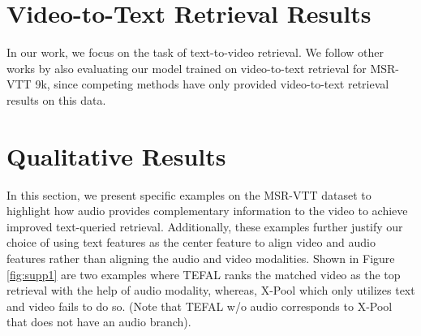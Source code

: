 \documentclass[10pt,twocolumn,letterpaper]{article}
\begin{document}
\clearpage


\ificcvfinal
\thispagestyle{empty}
\fi
\appendix



\setcounter{table}{0}
\setcounter{figure}{0}
\renewcommand{\thetable}{T\arabic{table}}
\renewcommand{\thefigure}{F\arabic{figure}}

\section{Video-to-Text Retrieval Results}

In our work, we focus on the task of text-to-video retrieval. We follow other works by also evaluating our model trained on video-to-text retrieval for MSR-VTT 9k, since competing methods have only provided video-to-text retrieval results on this data. 

\begin{table}[hbt!]
 \centering
 \caption{Video-to-Text Retrieval Results on MSR-VTT 9k split. All works use a CLIP ViT-B/32 backbone which is pre-trained on this Wikipedia-based image-text dataset. }
   \label{tab:v-t-9k}
 \end{table}


\section{Qualitative Results}
In this section, we present specific examples on the MSR-VTT dataset \cite{msrvtt} to highlight how audio provides complementary information to the video to achieve improved text-queried retrieval. Additionally, these examples further justify our choice of using text features as the center feature to align video and audio features rather than aligning the audio and video modalities. Shown in Figure \ref{fig:supp1} are two examples where TEFAL ranks the matched video as the top retrieval with the help of audio modality, whereas, X-Pool \cite{gorti2022xpool} which only utilizes text and video fails to do so. (Note that TEFAL w/o audio corresponds to X-Pool that does not have an audio branch). 
\end{document}

